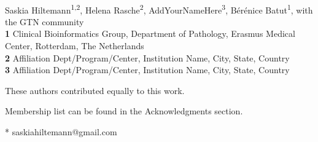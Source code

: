 \documentclass[10pt,letterpaper]{article}
\begin{document}
\vspace*{0.2in}

\begin{flushleft}
{\Large
\textbf{} %
}
\newline
\\
Saskia Hiltemann\textsuperscript{1,2\Yinyang\textpilcrow},
Helena Rasche\textsuperscript{2\Yinyang},
AddYourNameHere\textsuperscript{3},
Bérénice Batut\textsuperscript{1\Yinyang},
with the GTN community
\\
\bigskip
\textbf{1} Clinical Bioinformatics Group, Department of Pathology, Erasmus Medical Center, Rotterdam, The Netherlands \\
\textbf{2} Affiliation Dept/Program/Center, Institution Name, City, State, Country \\
\textbf{3} Affiliation Dept/Program/Center, Institution Name, City, State, Country \\
\bigskip

%
%
\Yinyang These authors contributed equally to this work.




\textpilcrow Membership list can be found in the Acknowledgments section.

* saskiahiltemann@gmail.com

\end{flushleft}
\end{document}
